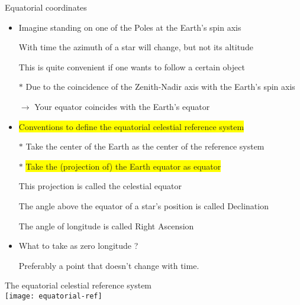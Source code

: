 \Tr
\onecolumn
\begin{center}
{\red Equatorial coordinates}
\end{center}
%
\begin{itemize}
\item Imagine standing on one of the Poles at the Earth's spin axis
\item[] With time the azimuth of a star will change, but not its altitude
\item[] This is quite convenient if one wants to follow a certain object
\item[$\ast$] Due to the coincidence of the Zenith-Nadir axis with the Earth's spin axis
\item[] $\rightarrow$ Your equator coincides with the Earth's equator
\item \colorbox{yellow}{Conventions to define the equatorial celestial reference system}
\item[$\ast$] {\blue Take the center of the Earth as the center of the reference system}
\item[$\ast$] \colorbox{yellow}{Take the (projection of) the Earth equator as equator}
\item[] This projection is called the {\blue celestial equator}
\item[] The {\blue angle above the equator} of a star's position is called {\blue Declination}
\item[] The angle of longitude is called {\blue Right Ascension}
\item {\red What to take as zero longitude ?}
\item[] Preferably a point that doesn't change with time.
\end{itemize}

\Tr
\onecolumn
\begin{center}
{\blue The equatorial celestial reference system}\\[3mm]
\texttt{[image: equatorial-ref]}
\end{center}

